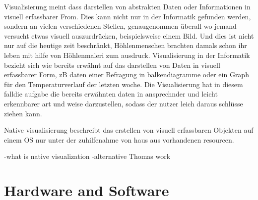 Visualisierung meint dass darstellen von abstrakten Daten oder Informationen in visuell erfassbarer From. Dies kann nicht nur in der Informatik gefunden werden, sondern an vielen verschiedenen Stellen, genaugenommen überall wo jemand versucht etwas visuell auszurdrücken, beispielsweise einem Bild. Und dies ist nicht nur auf die heutige zeit beschränkt, Höhlenmenschen brachten damals schon ihr leben mit hilfe von Höhlenmaleri zum ausdruck.
Visualisierung in der Informatik bezieht sich wie bereits erwähnt auf das darstellen von Daten in visuell erfassbarer Form, zB daten einer Befragung in balkendiagramme oder ein Graph für den Temperaturverlauf der letzten woche. Die Visualisierung hat in diesem falldie aufgabe die bereits erwähnten daten in ansprechnder und leicht erkennbarer art und weise darzustellen, sodass der nutzer leich daraus schlüsse ziehen kann.

Native visualisierung beschreibt das erstellen von visuell erfassbaren Objekten auf einem OS nur unter der zuhilfenahme von haus aus vorhandenen resourcen.

-what is native visualization
-alternative Thomas work
\newpage
\section{Hardware and Software}